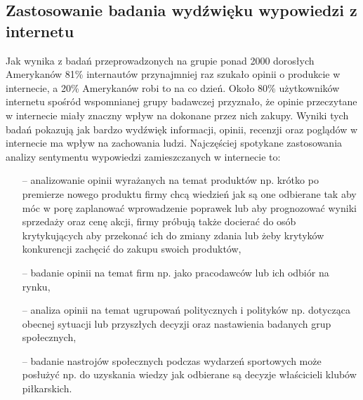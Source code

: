 \subsection{Zastosowanie badania wydźwięku wypowiedzi z internetu}
Jak wynika z badań przeprowadzonych na grupie ponad 2000 dorosłych Amerykanów 81\% internautów przynajmniej raz szukało opinii o produkcie w internecie, a 20\% Amerykanów robi to na co dzień. Około 80\% użytkowników internetu spośród wspomnianej grupy badawczej przyznało, że opinie przeczytane w internecie miały znaczny wpływ na dokonane przez nich zakupy. Wyniki tych badań pokazują jak bardzo wydźwięk informacji, opinii, recenzji oraz poglądów w internecie ma wpływ na zachowania ludzi. Najczęściej spotykane zastosowania analizy sentymentu wypowiedzi zamieszczanych w internecie to:

\begin{itemize}
	\item[--] analizowanie opinii wyrażanych na temat produktów np. krótko po premierze nowego produktu firmy chcą wiedzień jak są one odbierane tak aby móc w porę zaplanować wprowadzenie poprawek lub aby prognozować wyniki sprzedaży oraz cenę akcji, firmy próbują także docierać do osób krytykujących aby przekonać ich do zmiany zdania lub żeby krytyków konkurencji zachęcić do zakupu swoich produktów,
	\item[--] badanie opinii na temat firm np. jako pracodawców lub ich odbiór na rynku,
	\item[--] analiza opinii na temat ugrupowań politycznych i polityków np. dotycząca obecnej sytuacji lub przyszłych decyzji oraz nastawienia badanych grup społecznych,
	\item[--] badanie nastrojów społecznych podczas wydarzeń sportowych może posłużyć np. do uzyskania wiedzy jak odbierane są decyzje właścicieli klubów piłkarskich. 
\end{itemize}

   


